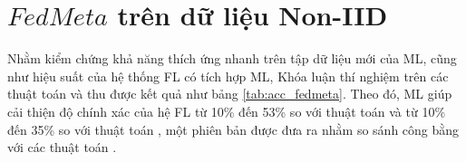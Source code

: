 \begin{table}[H]
    \centering
    \caption{Bảng độ chính xác (\%) của thuật toán FedAvg, FedAvgMeta, FedPerMeta tính trên điểm dữ liệu (dữ liệu IID và Non-IID)}
    \label{tab:fedavg_acc}
\end{table}

\section{$FedMeta$ trên dữ liệu Non-IID}


Nhằm kiểm chứng khả năng thích ứng nhanh trên tập dữ liệu mới của ML, cũng như hiệu suất của hệ thống FL có tích hợp ML, Khóa luận thí nghiệm trên các thuật toán  và thu được kết quả như bảng \ref{tab:acc_fedmeta}. Theo đó, ML giúp cải thiện độ chính xác của hệ FL từ 10\% đến 53\% so với thuật toán  và từ 10\% đến 35\% so với thuật toán , một phiên bản được đưa ra nhằm so sánh công bằng với các thuật toán .

